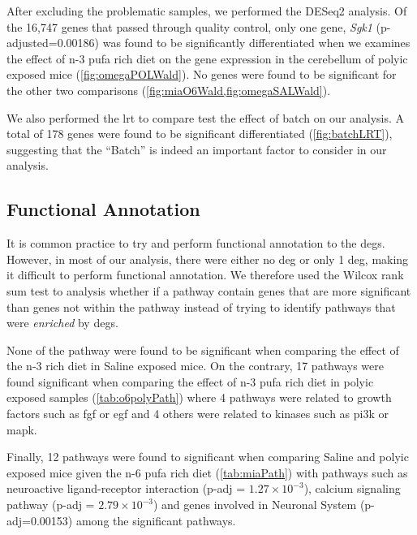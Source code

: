 After excluding the problematic samples, we performed the DESeq2 analysis.
Of the 16,747 genes that passed through quality control, only one gene, \textit{Sgk1} (p-adjusted=0.00186) was found to be significantly differentiated when we examines the effect of n-3 \gls{pufa} rich diet on the gene expression in the cerebellum of \gls{polyic} exposed mice (\cref{fig:omegaPOLWald}).
No genes were found to be significant for the other two comparisons (\cref{fig:miaO6Wald,fig:omegaSALWald}).

We also performed the \gls{lrt} to compare test the effect of batch on our analysis. 
A total of 178 genes were found to be significant differentiated (\cref{fig:batchLRT}), suggesting that the ``Batch'' is indeed an important factor to consider in our analysis.

\subsection{Functional Annotation}
It is common practice to try and perform functional annotation to the \glspl{deg}. 
However, in most of our analysis, there were either no \gls{deg} or only 1 \gls{deg}, making it difficult to perform functional annotation.
We therefore used the Wilcox rank sum test to analysis whether if a pathway contain genes that are more significant than genes not within the pathway instead of trying to identify pathways that were \emph{enriched} by \glspl{deg}.

None of the pathway were found to be significant when comparing the effect of the n-3 rich diet in Saline exposed mice. 
On the contrary, 17 pathways were found significant when comparing the effect of n-3 \gls{pufa} rich diet in \gls{polyic} exposed samples (\cref{tab:o6polyPath}) where 4 pathways were related to growth factors such as \gls{fgf} or \gls{egf} and 4 others were related to kinases such as \gls{pi3k} or \gls{mapk}.

Finally, 12 pathways were found to significant when comparing Saline and \gls{polyic} exposed mice given the n-6 \gls{pufa} rich diet (\cref{tab:miaPath}) with pathways such as neuroactive ligand-receptor interaction (p-adj = $1.27\times10^{-3}$), calcium signaling pathway (p-adj = $2.79\times10^{-3}$) and genes involved in Neuronal System (p-adj=0.00153) among the significant pathways.

